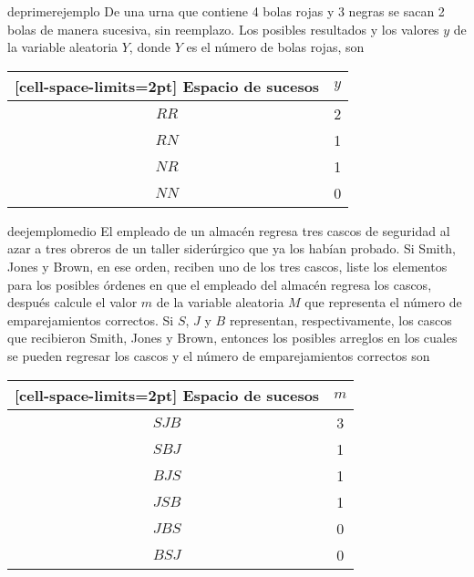 \begin{examplebox}{}{deprimerejemplo}
    De una urna que contiene 4 bolas rojas y 3 negras se sacan 2 bolas de manera sucesiva, sin reemplazo. Los posibles resultados y los valores $y$ de la variable aleatoria $Y$, donde $Y$ es el número de bolas rojas, son
    \begin{center}
        \begin{NiceTabular}{cc}[cell-space-limits=2pt]
            \toprule
            \textbf{Espacio de sucesos} & $y$ \\
            \midrule
            $RR$ & 2 \\
            $RN$ & 1 \\
            $NR$ & 1 \\
            $NN$ & 0 \\
            \bottomrule
        \end{NiceTabular}
        \captionsetup*[table]{hypcap=false}
    \end{center}
\end{examplebox}

\begin{examplebox}{}{deejemplomedio}
    El empleado de un almacén regresa tres cascos de seguridad al azar a tres obreros de un taller siderúrgico que ya los habían probado. Si Smith, Jones y Brown, en ese orden, reciben uno de los tres cascos, liste los elementos para los posibles órdenes en que el empleado del almacén regresa los cascos, después calcule el valor $m$ de la variable aleatoria $M$ que representa el número de emparejamientos correctos.
    \tcblower
    \solucion Si $S$, $J$ y $B$ representan, respectivamente, los cascos que recibieron Smith, Jones y Brown, entonces los posibles arreglos en los cuales se pueden regresar los cascos y el número de emparejamientos correctos son
    \begin{center}
        \begin{NiceTabular}{cc}[cell-space-limits=2pt]
            \toprule
            \textbf{Espacio de sucesos} & $m$ \\
            \midrule
            $SJB$ & 3 \\
            $SBJ$ & 1 \\
            $BJS$ & 1 \\
            $JSB$ & 1 \\
            $JBS$ & 0 \\
            $BSJ$ & 0 \\
            \bottomrule
        \end{NiceTabular}
        \captionsetup*[table]{hypcap=false}
    \end{center}
\end{examplebox}

